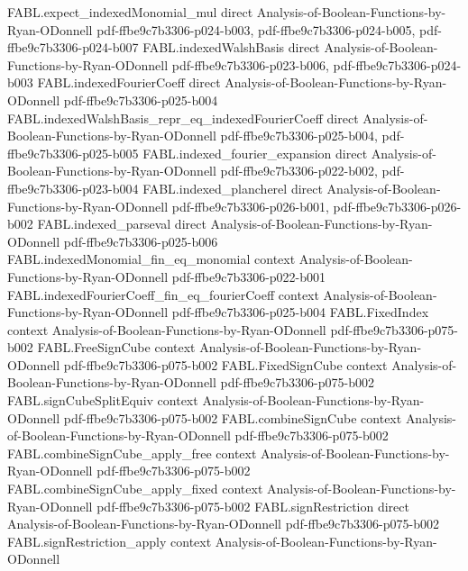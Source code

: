 \begin{theorem}
\proofstep
  {FABL.expect_indexedMonomial_mul}
  {direct}
  {Analysis-of-Boolean-Functions-by-Ryan-ODonnell}
  {pdf-ffbe9c7b3306-p024-b003,
    pdf-ffbe9c7b3306-p024-b005,
    pdf-ffbe9c7b3306-p024-b007}
\proofstep
  {FABL.indexedWalshBasis}
  {direct}
  {Analysis-of-Boolean-Functions-by-Ryan-ODonnell}
  {pdf-ffbe9c7b3306-p023-b006,
    pdf-ffbe9c7b3306-p024-b003}
\proofstep
  {FABL.indexedFourierCoeff}
  {direct}
  {Analysis-of-Boolean-Functions-by-Ryan-ODonnell}
  {pdf-ffbe9c7b3306-p025-b004}
\proofstep
  {FABL.indexedWalshBasis_repr_eq_indexedFourierCoeff}
  {direct}
  {Analysis-of-Boolean-Functions-by-Ryan-ODonnell}
  {pdf-ffbe9c7b3306-p025-b004,
    pdf-ffbe9c7b3306-p025-b005}
\proofstep
  {FABL.indexed_fourier_expansion}
  {direct}
  {Analysis-of-Boolean-Functions-by-Ryan-ODonnell}
  {pdf-ffbe9c7b3306-p022-b002,
    pdf-ffbe9c7b3306-p023-b004}
\proofstep
  {FABL.indexed_plancherel}
  {direct}
  {Analysis-of-Boolean-Functions-by-Ryan-ODonnell}
  {pdf-ffbe9c7b3306-p026-b001,
    pdf-ffbe9c7b3306-p026-b002}
\proofstep
  {FABL.indexed_parseval}
  {direct}
  {Analysis-of-Boolean-Functions-by-Ryan-ODonnell}
  {pdf-ffbe9c7b3306-p025-b006}
\proofstep
  {FABL.indexedMonomial_fin_eq_monomial}
  {context}
  {Analysis-of-Boolean-Functions-by-Ryan-ODonnell}
  {pdf-ffbe9c7b3306-p022-b001}
\proofstep
  {FABL.indexedFourierCoeff_fin_eq_fourierCoeff}
  {context}
  {Analysis-of-Boolean-Functions-by-Ryan-ODonnell}
  {pdf-ffbe9c7b3306-p025-b004}
\proofstep
  {FABL.FixedIndex}
  {context}
  {Analysis-of-Boolean-Functions-by-Ryan-ODonnell}
  {pdf-ffbe9c7b3306-p075-b002}
\proofstep
  {FABL.FreeSignCube}
  {context}
  {Analysis-of-Boolean-Functions-by-Ryan-ODonnell}
  {pdf-ffbe9c7b3306-p075-b002}
\proofstep
  {FABL.FixedSignCube}
  {context}
  {Analysis-of-Boolean-Functions-by-Ryan-ODonnell}
  {pdf-ffbe9c7b3306-p075-b002}
\proofstep
  {FABL.signCubeSplitEquiv}
  {context}
  {Analysis-of-Boolean-Functions-by-Ryan-ODonnell}
  {pdf-ffbe9c7b3306-p075-b002}
\proofstep
  {FABL.combineSignCube}
  {context}
  {Analysis-of-Boolean-Functions-by-Ryan-ODonnell}
  {pdf-ffbe9c7b3306-p075-b002}
\proofstep
  {FABL.combineSignCube_apply_free}
  {context}
  {Analysis-of-Boolean-Functions-by-Ryan-ODonnell}
  {pdf-ffbe9c7b3306-p075-b002}
\proofstep
  {FABL.combineSignCube_apply_fixed}
  {context}
  {Analysis-of-Boolean-Functions-by-Ryan-ODonnell}
  {pdf-ffbe9c7b3306-p075-b002}
\proofstep
  {FABL.signRestriction}
  {direct}
  {Analysis-of-Boolean-Functions-by-Ryan-ODonnell}
  {pdf-ffbe9c7b3306-p075-b002}
\proofstep
  {FABL.signRestriction_apply}
  {context}
  {Analysis-of-Boolean-Functions-by-Ryan-ODonnell}

\end{theorem}

